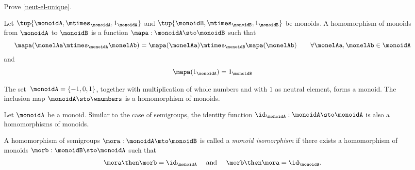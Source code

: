 \begin{exercise}
Prove \cref{neut-el-unique}. 
\end{exercise}

\begin{definition}
  \label{def:monoid-mor}
Let $\tup{\monoidA, \mtimes_\monoidA, 1_\monoidA}$ and $\tup{\monoidB, \mtimes_\monoidB, 1_\monoidB}$ be monoids. A homomorphism of monoids from $\monoidA$ to $\monoidB$ is a function $\mapa : \monoidA \sto \monoidB$ such that
\begin{equation}\label{mon-mor-comp}
\mapa (\monelAa \mtimes_{\monoidA} \monelAb) = \mapa (\monelAa) \mtimes_{\monoidB}  \mapa(\monelAb) \quad \quad \forall \monelAa, \monelAb \in \monoidA
\end{equation}
and 
\begin{equation}\label{mon-id-comp}
\mapa (1_\monoidA) = 1_{\monoidB}
\end{equation}
\end{definition}

\begin{example}
The set~$\monoidA = \{ -1, 0, 1 \}$, together with multiplication of whole numbers and with $1$ as neutral element, forms a monoid. The inclusion map $ \monoidA \sto \wnumbers$ is a homomorphism of monoids. 
 \end{example}
 


\begin{definition}
  \label{def:identity-mon-mor}
Let $\monoidA$ be a monoid. Similar to the case of semigroups, the identity function $\id_\monoidA: \monoidA \sto \monoidA$ is also a homomorphisms of monoids.  
\end{definition}



\begin{definition}
  \label{def:monoid-iso}
A homomorphism of semigroups $\mora: \monoidA \mto \monoidB$ is called a \emph{monoid isomorphism} if there exists a homomorphism of monoids $\morb: \monoidB \sto \monoidA$ such that 
\begin{equation}\label{sgrp-iso-cond}
\mora \then \morb = \id_\monoidA \quad \text{ and } \quad  \morb \then \mora = \id_\monoidB. 
\end{equation} 
\end{definition}


